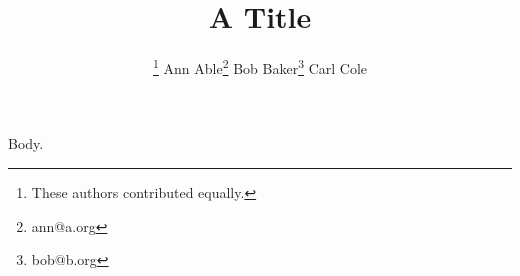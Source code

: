 \documentclass{article}
\title{A Title}
\author{\thanks{These authors contributed equally.} Ann Able\thanks{ann@a.org} Bob Baker\thanks{bob@b.org} Carl Cole}
\begin{document}
\maketitle Body.
\end{document}
